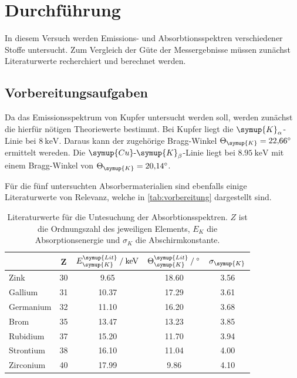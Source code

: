 \section{Durchführung}
\label{sec:Durchführung}
In diesem Versuch werden Emissions- und Absorbtionsspektren verschiedener Stoffe untersucht.
Zum Vergleich der Güte der Messergebnisse müssen zunächst Literaturwerte recherchiert und berechnet werden. 
\subsection{Vorbereitungsaufgaben}
\label{subsec:vorbereitung}
Da das Emissionsspektrum von Kupfer untersucht werden soll, werden zunächst die hierfür nötigen Theoriewerte bestimmt.
Bei Kupfer liegt die $\symup{K}_\alpha$-Linie bei $\qty{8}{\kilo\electronvolt}$. Daraus kann der zugehörige Bragg-Winkel $\Theta_{\symup{K}} = \qty{22.66}{\degree}$ 
ermittelt wereden. Die $\symup{Cu}\text{-}\symup{K}_{\beta}$-Linie liegt bei $\qty{8.95}{\kilo\electronvolt}$ mit einem Bragg-Winkel von $\Theta_{\symup{K}} = \qty{20.14}{\degree}$.

Für die fünf untersuchten Absorbermaterialien sind ebenfalls einige Literaturwerte von Relevanz, welche in \autoref{tab:vorbereitung} dargestellt sind.
\begin{table}
    \centering
    \caption{Literaturwerte für die Untesuchung der Absorbtionsspektren. $Z$ ist die Ordnungszahl des jeweiligen Elements, $E_K$ die Absorptionsenergie und $\sigma_K$
    die Abschirmkonstante.}
    \label{tab:vorbereitung}
    \begin{tabular}{l c S S S}
        \toprule
         & Z & {$E_{\symup{K}}^{\symup{Lit}} \mathbin{/} \unit{\kilo\electronvolt}$} & {$\Theta_{\symup{K}}^{\symup{Lit}} \mathbin{/} \unit{\degree}$} & {$\sigma_{\symup{K}}$} \\
        \midrule
        Zink         & 30 &  9.65 & 18.60 & 3.56 \\
        Gallium      & 31 & 10.37 & 17.29 & 3.61 \\
        Germanium    & 32 & 11.10 & 16.20 & 3.68 \\
        Brom         & 35 & 13.47 & 13.23 & 3.85 \\
        Rubidium     & 37 & 15.20 & 11.70 & 3.94 \\
        Strontium    & 38 & 16.10 & 11.04 & 4.00 \\
        Zirconium    & 40 & 17.99 &  9.86 & 4.10 \\
    \bottomrule
    \end{tabular}
\end{table}
